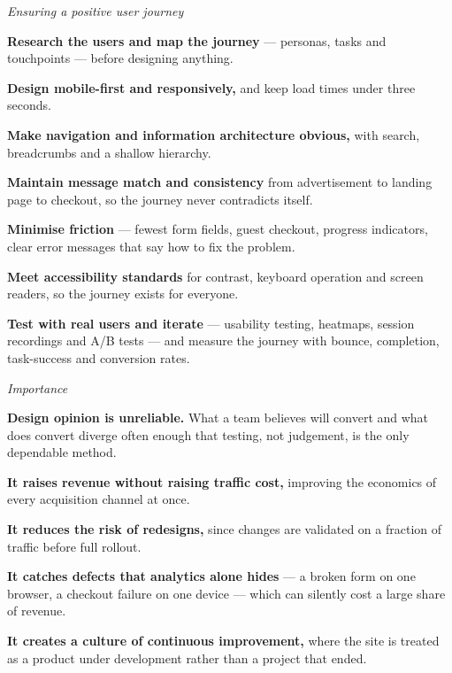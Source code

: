 \begin{qlist}
\textit{Ensuring a positive user journey}
\begin{apts}\setcounter{enumi}{5}
\item \textbf{Research the users and map the journey} --- personas, tasks and
      touchpoints --- before designing anything.
\item \textbf{Design mobile-first and responsively,} and keep load times under
      three seconds.
\item \textbf{Make navigation and information architecture obvious,} with
      search, breadcrumbs and a shallow hierarchy.
\item \textbf{Maintain message match and consistency} from advertisement to
      landing page to checkout, so the journey never contradicts itself.
\item \textbf{Minimise friction} --- fewest form fields, guest checkout,
      progress indicators, clear error messages that say how to fix the problem.
\item \textbf{Meet accessibility standards} for contrast, keyboard operation and
      screen readers, so the journey exists for everyone.
\item \textbf{Test with real users and iterate} --- usability testing, heatmaps,
      session recordings and A/B tests --- and measure the journey with bounce,
      completion, task-success and conversion rates.
\end{apts}

\textit{Importance}
\begin{apts}
\item \textbf{Design opinion is unreliable.} What a team believes will convert
      and what does convert diverge often enough that testing, not judgement, is
      the only dependable method.
\item \textbf{It raises revenue without raising traffic cost,} improving the
      economics of every acquisition channel at once.
\item \textbf{It reduces the risk of redesigns,} since changes are validated on
      a fraction of traffic before full rollout.
\item \textbf{It catches defects that analytics alone hides} --- a broken form
      on one browser, a checkout failure on one device --- which can silently
      cost a large share of revenue.
\item \textbf{It creates a culture of continuous improvement,} where the site is
      treated as a product under development rather than a project that ended.
\end{apts}


\end{qlist}
